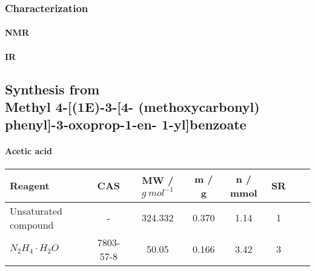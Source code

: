 \documentclass[../Master.tex]{subfiles}
\begin{document}
\subsubsection{Characterization}
\newline
\paragraph{NMR}


\paragraph{IR}


\newpage \subsection{Synthesis from \\Methyl 4-[(1E)-3-[4- (methoxycarbonyl) phenyl]-3-oxoprop-1-en-
1-yl]benzoate}

\paragraph{Acetic acid}

\begin{center}
	\begin{tabular}[b]{lccccccc}
		\toprule
		Reagent               & CAS       & MW / \(g \ mol^{-1}\) & m / g & n / mmol & SR \\
		\midrule
		Unsaturated compound  & -         & 324.332               & 0.370 & 1.14     & 1  \\
		\(N_2H_4 \cdot H_2O\) & 7803-57-8 & 50.05                 & 0.166 & 3.42     & 3  \\
		\bottomrule
	\end{tabular}
\end{center}

\end{document}
